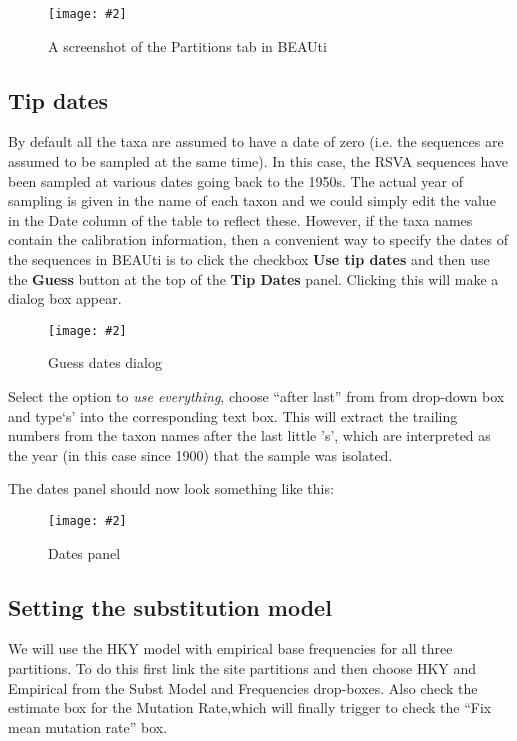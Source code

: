 \documentclass[12pt]{article}
\newcommand{\includeimage}[2][]{%
\texttt{[image: \#2]}
}
\begin{document}
\begin{figure}
\centering	
\includeimage[width=0.8\textwidth]{figures/BEAUti_partition}
\label{fig:BEAUti_partition}
\caption{A screenshot of the Partitions tab in BEAUti}
\end{figure}

\subsection*{Tip dates}
By default all the taxa are assumed to have a date of zero (i.e. the sequences are assumed to be sampled at the same time).
In this case, the RSVA sequences have been sampled at various dates going back to the 1950s. The actual year of sampling
is given in the name of each taxon and we could simply edit the value in the Date column of the table to reflect these.
However, if the taxa names contain the calibration information, then a convenient way to specify the dates of the sequences
in BEAUti is to click the checkbox {\bf Use tip dates} and then use the {\bf Guess} button at the top of the {\bf Tip Dates} panel. Clicking this will make a dialog box appear.

\begin{figure}
\centering	
\includeimage[width=0.6\textwidth]{figures/BEAUti_GuessDates}
\label{fig:BEAUti_GuessDates}
\caption{Guess dates dialog}
\end{figure}


Select the option to {\it use everything}, choose ``after last'' from from drop-down box and type`s' into the corresponding text box. This will extract the trailing numbers from the taxon names after the last little 's', which are interpreted as the year (in this case since 1900) that the sample was isolated.

The dates panel should now look something like this:

\begin{figure}
\centering	
\includeimage[width=0.8\textwidth]{figures/BEAUti_dates}
\label{fig:BEAUti_dates}
\caption{Dates panel}
\end{figure}


\subsection*{Setting the substitution model}
We will use the HKY model with empirical base frequencies for all three partitions. To do this first link the site partitions and then choose HKY and Empirical from the Subst Model and Frequencies drop-boxes. Also check the estimate box for the Mutation Rate,which will finally trigger to check the ``Fix mean mutation rate'' box. 
\end{document}

